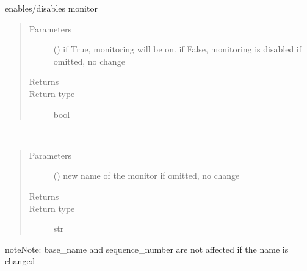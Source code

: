 \documentclass[letterpaper,10pt,english]{sphinxmanual}
\begin{document}
\begin{fulllineitems}

\begin{fulllineitems}
\label{\detokenize{Reference:salabim.Monitor.monitor}}
enables/disables monitor
\begin{quote}\begin{description}
\item[{Parameters}] \leavevmode
{} () \textendash{} if True, monitoring will be on. 
if False, monitoring is disabled 
if omitted, no change

\item[{Returns}] \leavevmode
{}

\item[{Return type}] \leavevmode
bool

\end{description}\end{quote}

\end{fulllineitems}


\begin{fulllineitems}
\label{\detokenize{Reference:salabim.Monitor.name}}~\begin{quote}\begin{description}
\item[{Parameters}] \leavevmode
{} () \textendash{} new name of the monitor
if omitted, no change

\item[{Returns}] \leavevmode
{}

\item[{Return type}] \leavevmode
str

\end{description}\end{quote}

\begin{sphinxadmonition}{note}{Note:}
base\_name and sequence\_number are not affected if the name is changed
\end{sphinxadmonition}


\end{fulllineitems}
\end{fulllineitems}
\end{document}
